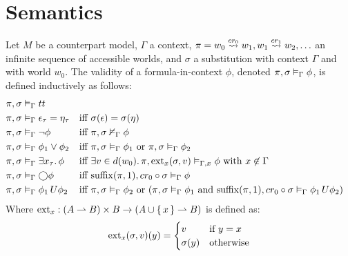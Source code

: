 \section{Semantics}

\begin{definition}\label{def:fosemantic}
Let $M$ be a counterpart model, $\Gamma$ a context, $\pi = w_0 \overset{cr_0}{\rightsquigarrow} w_1, w_1 \overset{cr_1}{\rightsquigarrow} w_2, \ldots$
an infinite sequence of accessible worlds, and $\sigma$ a substitution with context $\Gamma$ and with world $w_0$.
The validity of a formula-in-context $\phi$, denoted ${\pi}, {\sigma} \vDash_{\Gamma} {\phi}$, is defined inductively as follows:
\begin{align*}
  \pi, \sigma &\vDash_\Gamma tt \\
  \pi, \sigma &\vDash_\Gamma \epsilon_\tau = \eta_\tau &&\text{iff } \sigma(\epsilon) = \sigma(\eta) \\
  \pi, \sigma &\vDash_\Gamma \neg\phi &&\text{iff } {\pi}, {\sigma} \nvDash_{\Gamma} {\phi} \\
  \pi, \sigma &\vDash_\Gamma \phi_1 \lor \phi_2
      &&\text{iff } {\pi}, {\sigma} \vDash_{\Gamma} {\phi_1} \text{ or } {\pi}, {\sigma} \vDash_{\Gamma} {\phi_2} \\
  \pi, \sigma &\vDash_\Gamma \exists {x_\tau} \ldotp {\phi}
      &&\text{iff } \exists {v \in d(w_0)} \ldotp {{\pi}, {\operatorname{ext}_x(\sigma, v)} \vDash_{\Gamma, x} {\phi}}
        \text{ with } x \not\in \Gamma \\
  \pi, \sigma &\vDash_\Gamma \bigcirc{\phi}
      &&\text{iff } {\operatorname{suffix}(\pi, 1)}, {cr_0 \circ \sigma} \vDash_{\Gamma} {\phi} \\
  \pi, \sigma &\vDash_\Gamma {\phi_1}\,U {\phi_2}
      &&\text{iff } {\pi}, {\sigma} \vDash_{\Gamma} {\phi_2} \text{ or } ({\pi}, {\sigma} \vDash_{\Gamma} {\phi_1}
        \text { and } {\operatorname{suffix}(\pi, 1)}, {cr_0 \circ \sigma} \vDash_{\Gamma} {{\phi_1}\,U {\phi_2}})
\end{align*}
  Where $\operatorname{ext}_x : (A \rightharpoonup B) \times B \to (A \cup \set{x} \rightharpoonup B)$ is defined as:
  \[
    \operatorname{ext}_x(\sigma, v)(y) = \begin{cases} v & \text{if } y = x \\ \sigma(y) & \text{otherwise}\end{cases}
  \]
\end{definition}

